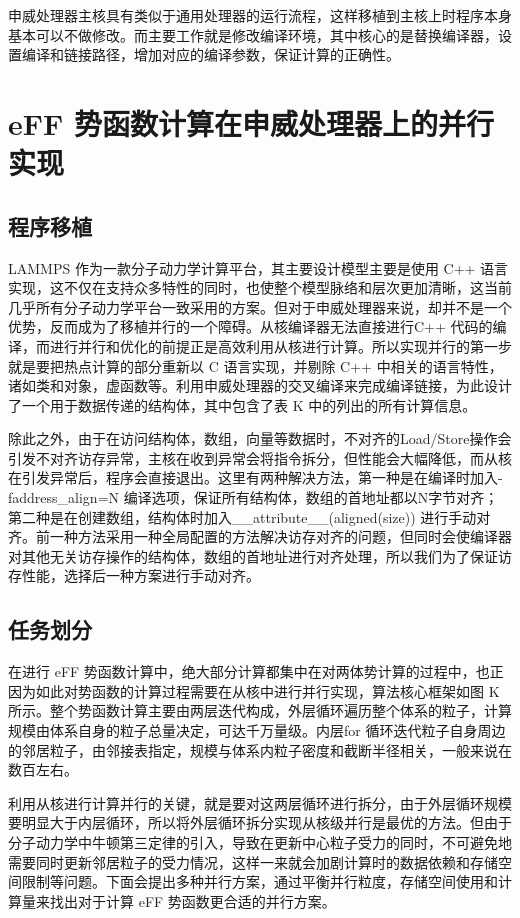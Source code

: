 申威处理器主核具有类似于通用处理器的运行流程，这样移植到主核上时程序本身基本可以不做修改。而主要工作就是修改编译环境，其中核心的是替换编译器，设置编译和链接路径，增加对应的编译参数，保证计算的正确性。

\section{eFF 势函数计算在申威处理器上的并行实现}
\subsection{程序移植}
LAMMPS 作为一款分子动力学计算平台，其主要设计模型主要是使用 C++ 语言实现，这不仅在支持众多特性的同时，也使整个模型脉络和层次更加清晰，这当前几乎所有分子动力学平台一致采用的方案。但对于申威处理器来说，却并不是一个优势，反而成为了移植并行的一个障碍。从核编译器无法直接进行C++ 代码的编译，而进行并行和优化的前提正是高效利用从核进行计算。所以实现并行的第一步就是要把热点计算的部分重新以 C 语言实现，并剔除 C++ 中相关的语言特性，诸如类和对象，虚函数等。利用申威处理器的交叉编译来完成编译链接，为此设计了一个用于数据传递的结构体，其中包含了表 K 中的列出的所有计算信息。

除此之外，由于在访问结构体，数组，向量等数据时，不对齐的Load/Store操作会引发不对齐访存异常，主核在收到异常会将指令拆分，但性能会大幅降低，而从核在引发异常后，程序会直接退出。这里有两种解决方法，第一种是在编译时加入-faddress\_align=N 编译选项，保证所有结构体，数组的首地址都以N字节对齐；第二种是在创建数组，结构体时加入\__attribute\__(aligned(size)) 进行手动对齐。前一种方法采用一种全局配置的方法解决访存对齐的问题，但同时会使编译器对其他无关访存操作的结构体，数组的首地址进行对齐处理，所以我们为了保证访存性能，选择后一种方案进行手动对齐。

\subsection{任务划分}
在进行 eFF 势函数计算中，绝大部分计算都集中在对两体势计算的过程中，也正因为如此对势函数的计算过程需要在从核中进行并行实现，算法核心框架如图 K 所示。整个势函数计算主要由两层迭代构成，外层循环遍历整个体系的粒子，计算规模由体系自身的粒子总量决定，可达千万量级。内层for 循环迭代粒子自身周边的邻居粒子，由邻接表指定，规模与体系内粒子密度和截断半径相关，一般来说在数百左右。

利用从核进行计算并行的关键，就是要对这两层循环进行拆分，由于外层循环规模要明显大于内层循环，所以将外层循环拆分实现从核级并行是最优的方法。但由于分子动力学中牛顿第三定律的引入，导致在更新中心粒子受力的同时，不可避免地需要同时更新邻居粒子的受力情况，这样一来就会加剧计算时的数据依赖和存储空间限制等问题。下面会提出多种并行方案，通过平衡并行粒度，存储空间使用和计算量来找出对于计算 eFF 势函数更合适的并行方案。

